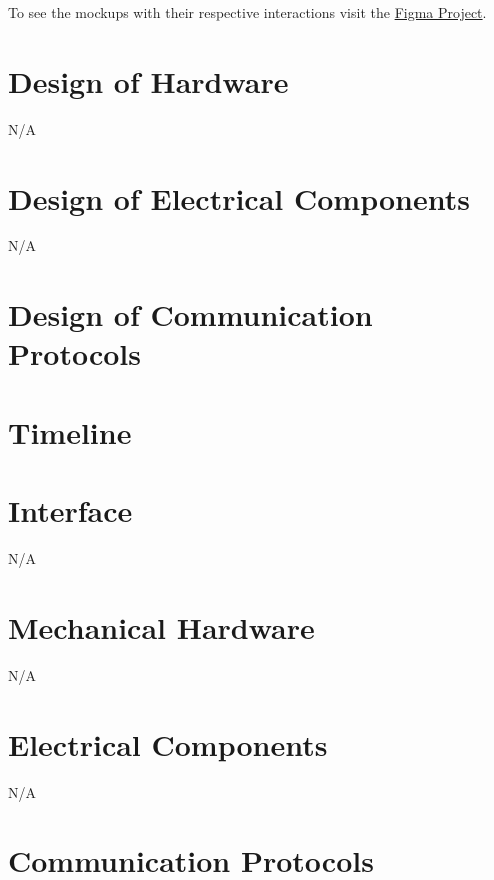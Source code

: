 \documentclass[12pt, titlepage]{article}
\begin{document}
To see the mockups with their respective interactions visit the \href{https://www.figma.com/file/58wCxZa5xulKIIYw8eX8Pr/REACH-Trial-Functionality?type=design&node-id=0%3A1&mode=design&t=ff0O5TWpZokg19Q8-1}{Figma Project}.


\section{Design of Hardware}

N/A

\section{Design of Electrical Components}

N/A

\section{Design of Communication Protocols}

\section{Timeline}


% 

\newpage{}

\appendix

\section{Interface} 

N/A 

\section{Mechanical Hardware}

N/A

\section{Electrical Components}

N/A

\section{Communication Protocols}
\end{document}
